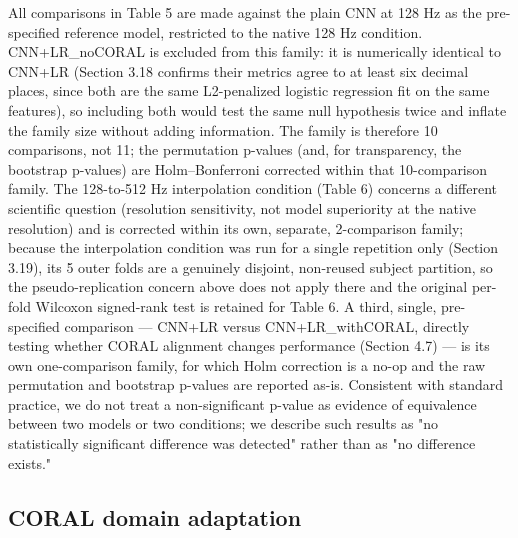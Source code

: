 \documentclass[a4paper,fleqn]{cas-sc}
\begin{document}
All comparisons in Table 5 are made against the plain CNN at 128 Hz as the pre-specified reference model, restricted to the native 128 Hz condition. CNN+LR\_noCORAL is excluded from this family: it is numerically identical to CNN+LR (Section 3.18 confirms their metrics agree to at least six decimal places, since both are the same L2-penalized logistic regression fit on the same features), so including both would test the same null hypothesis twice and inflate the family size without adding information. The family is therefore 10 comparisons, not 11; the permutation p-values (and, for transparency, the bootstrap p-values) are Holm--Bonferroni corrected \cite{holm1979simple} within that 10-comparison family. The 128-to-512 Hz interpolation condition (Table 6) concerns a different scientific question (resolution sensitivity, not model superiority at the native resolution) and is corrected within its own, separate, 2-comparison family; because the interpolation condition was run for a single repetition only (Section 3.19), its 5 outer folds are a genuinely disjoint, non-reused subject partition, so the pseudo-replication concern above does not apply there and the original per-fold Wilcoxon signed-rank test \cite{wilcoxon1945individual} is retained for Table 6. A third, single, pre-specified comparison --- CNN+LR versus CNN+LR\_withCORAL, directly testing whether CORAL alignment changes performance (Section 4.7) --- is its own one-comparison family, for which Holm correction is a no-op and the raw permutation and bootstrap p-values are reported as-is. Consistent with standard practice, we do not treat a non-significant p-value as evidence of equivalence between two models or two conditions; we describe such results as "no statistically significant difference was detected" rather than as "no difference exists."



\subsection{CORAL domain adaptation}
\end{document}
